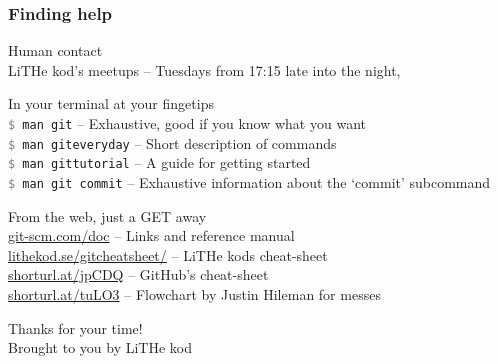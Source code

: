 \documentclass{beamer}
\newcommand{\command}[1]{\texttt{\textcolor{gray}{\$} {#1}}}
\begin{document}
\begin{frame}[fragile]
  \frametitle{Finding help}

  Human contact \\
  \hspace{1em} LiTHe kod's meetups -- Tuesdays from 17:15 late into the night, \\
  \vspace{1em}

  In your terminal at your fingetips \\
  \hspace{1em} \command{man git} -- Exhaustive, good if you know what you want \\
  \hspace{1em} \command{man giteveryday} -- Short description of commands \\
  \hspace{1em} \command{man gittutorial} -- A guide for getting started \\
  \hspace{1em} \command{man git commit} -- Exhaustive information about the `commit' subcommand\\
  \vspace{1em}

  From the web, just a GET away \\
  \hspace{1em} \url{git-scm.com/doc} -- Links and reference manual \\
  \hspace{1em} \url{lithekod.se/gitcheatsheet/} -- LiTHe kods cheat-sheet \\
  \hspace{1em} \url{shorturl.at/jpCDQ} -- GitHub's cheat-sheet \\
  \hspace{1em} \url{shorturl.at/tuLO3} -- Flowchart by Justin Hileman for messes\\

\end{frame}

\begin{frame}[fragile]
  \begin{center}
    \Huge Thanks for your time! \\[0.75em]
    \small Brought to you by LiTHe kod
  \end{center}
\end{frame}
\end{document}

